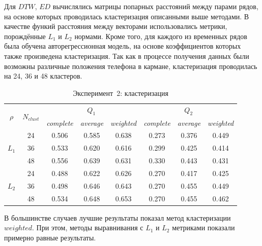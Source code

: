 \documentclass[12pt,twoside]{article}
\begin{document}
        Для $DTW$, $ED$ вычислялись матрицы попарных расстояний между парами рядов, на основе которых проводилась кластеризация описанными выше методами.
        В качестве функий расстояния между векторами использовались метрики, порождённые $L_1$  и $L_2$ нормами.
        Кроме того, для каждого из временных рядов была обучена авторегрессионная модель, на основе коэффициентов которых также произведена кластеризация.
        Так как в процессе получения данных были возможны различные положения телефона в кармане, кластеризация проводилась на 24, 36 и 48 кластеров.

        \begin{table}[h]
            \centering
            \begin{tabular}{c|c *{2}{|*{3}{c}}}
                \toprule
                 &  &  &  \\
                \cmidrule(r){3-8}
                && \textit{complete} & \textit{average} & \textit{weighted} & \textit{complete} & \textit{average} & \textit{weighted} \\
                \midrule
                    & 24    &   0.506  &   0.585 &    0.638  & 0.273   &  0.376    &   0.449  \\
                    & 36    &   0.533  &   0.620 &    0.616  & 0.299   &  0.425    &   0.414  \\
                    & 48    &   0.556  &   0.639 &    0.631  & 0.330   &  0.443    &   0.431  \\
            \midrule
                    & 24    &   0.488  &   0.622 &    0.626  & 0.270   &  0.417    &   0.425  \\
                    & 36    &   0.498  &   0.646 &    0.643  & 0.270   &  0.455    &   0.449  \\
                    & 48    &   0.534  &   0.648 &    0.653  & 0.270   &  0.455    &   0.462  \\
            \bottomrule
            \end{tabular}
            \caption{Эксперимент~2: кластеризация}
        \end{table}

    В большинстве случаев лучшие результаты показал метод кластеризации $weighted$.
    При этом, методы выравнивания с $L_1$ и $L_2$ метриками показали примерно равные результаты.
						
\end{document}
